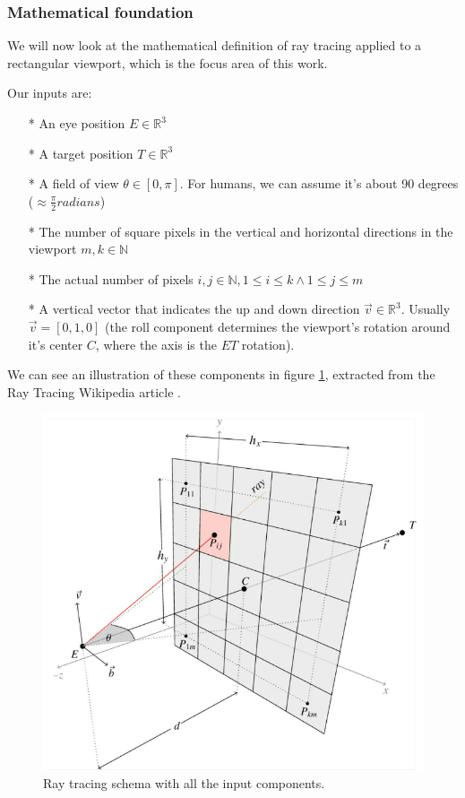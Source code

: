 \subsubsection{Mathematical foundation}
We will now look at the mathematical definition of ray tracing applied to a rectangular viewport, which is the focus area of this work.

Our inputs are:
\begin{itemize}
  \item[*]{An eye position $E \in \mathbb{R}^3$}
  \item[*]{A target position $T \in \mathbb{R}^3$}
  \item[*]{A field of view $\theta \in [0, \pi]$. For humans, we can assume it's about 90 degrees ($\approx \frac{\pi}{2} radians $)}
  \item[*]{The number of square pixels in the vertical and horizontal directions in the viewport $m, k \in \mathbb{N}$}
  \item[*]{The actual number of pixels $i, j \in \mathbb{N}, 1 \leq i \leq k \land 1 \leq j \leq m$}
  \item[*]{A vertical vector that indicates the up and down direction $\overrightarrow{v} \in \mathbb{R}^3$. Usually $\overrightarrow{v} = [0, 1, 0]$ (the roll component determines the viewport's rotation around it's center $C$, where the axis is the $ET$ rotation).}
\end{itemize}

We can see an illustration of these components in figure \ref{RaysViewportSchema}, extracted from the Ray Tracing Wikipedia article \cite{WikipediaRT}.

\begin{figure}[hbt!]
    \centering
    \includegraphics[width=1.0\textwidth]{figuras/RaysViewportSchema.png}
    \caption{Ray tracing schema with all the input components.}
    \label{RaysViewportSchema}
\end{figure}

